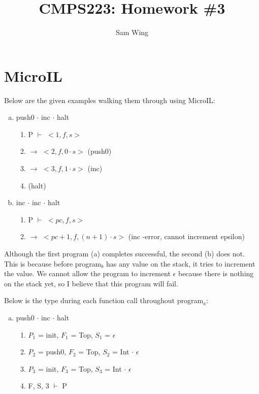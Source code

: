 \documentclass[11pt]{amsart}
\title{CMPS223: Homework \#3}
\author{Sam Wing}
\begin{document}
\maketitle
\section{MicroIL}

Below are the given examples walking them through using MicroIL:

\begin{enumerate}[a)]
	\item push0 $\cdot$ inc $\cdot$ halt
	\begin{enumerate}[1)]
		\item P $\vdash$ $< 1, f, s >$
		\item $\rightarrow$ $< 2, f, 0 \cdot s >$ (push0)
		\item $\rightarrow$ $< 3, f, 1 \cdot s >$ (inc)
		\item (halt)		
	\end{enumerate}
	
	\item inc $\cdot$ inc $\cdot$ halt
	\begin{enumerate}[1)]
		\item P $\vdash$ $< pc, f, s >$
		\item $\rightarrow$ $<pc + 1, f, (n + 1) \cdot s >$ (inc -error, cannot increment epsilon)
	\end{enumerate}
\end{enumerate}

Although the first program (a) completes successful, the second (b) does not.  This is because before program$_b$ has any value on the stack, it tries to increment the value.  We cannot allow the program to increment $\epsilon$ because there is nothing on the stack yet, so I believe that this program will fail.  

Below is the type during each function call throughout program$_a$:

\begin{enumerate}[a)]
	\item push0 $\cdot$ inc $\cdot$ halt
	\begin{enumerate}[1)]
		\item $P_1$ = init, $F_1$ = Top, $S_1$ = $\epsilon$	
		\item $P_2$ = push0, $F_2$ = Top, $S_2$ = Int $\cdot $  $\epsilon$
		\item $P_3$ = init, $F_3$ = Top, $S_3$ = Int $\cdot$ $\epsilon$
		\item F, S, 3 $\vdash$ P
	\end{enumerate}
\end{enumerate}
\end{document}
